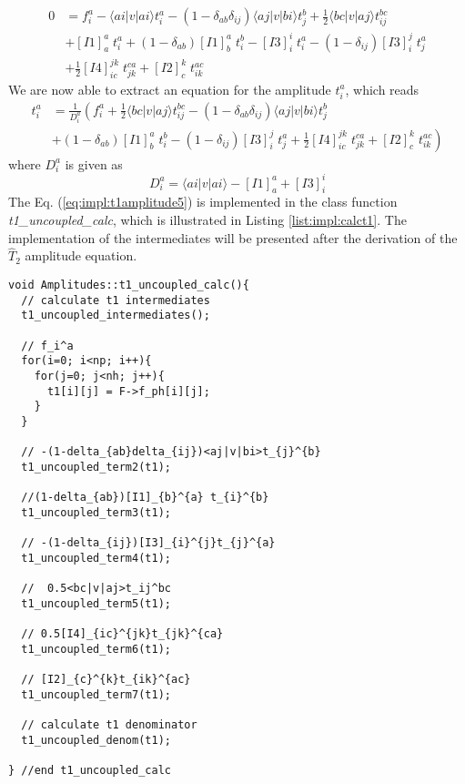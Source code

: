\begin{align}
0&=f_i^a - \langle ai|v|ai \rangle t_{i}^{a}-(1-\delta_{ab}\delta_{ij})\langle aj|v|bi \rangle t_{j}^{b}+\frac{1}{2}\langle bc|v|aj\rangle t_{ij}^{bc}\nonumber\\
&+[I1]_a^a\phantom{.}t_i^a+(1-\delta_{ab})[I1]_b^a\phantom{.}t_i^b-[I3]_i^i\phantom{.}t_{i}^{a}-(1-\delta_{ij})[I3]_i^j\phantom{.}t_{j}^{a}\nonumber\\
&+\frac{1}{2}[I4]_{ic}^{jk}\phantom{.}t_{jk}^{ca}+[I2]_c^k\phantom{.}t_{ik}^{ac}
\label{eq:impl:t1amplitude4}
\end{align}
We are now able to extract an equation for the amplitude $t_i^a$, which reads
\begin{align}
t_i^a&=\frac{1}{D_i^a}\left(f_i^a+\frac{1}{2}\langle bc|v|aj\rangle t_{ij}^{bc}-(1-\delta_{ab}\delta_{ij})\langle aj|v|bi \rangle t_{j}^{b}\right.\nonumber\\
&\left. +(1-\delta_{ab})[I1]_b^a\phantom{.}t_i^b-(1-\delta_{ij})[I3]_i^j\phantom{.}t_{j}^{a}+\frac{1}{2}[I4]_{ic}^{jk}\phantom{.}t_{jk}^{ca}+[I2]_c^k\phantom{.}t_{ik}^{ac}\right)
\label{eq:impl:t1amplitude5}
\end{align} 
where $D_i^a$ is given as
\begin{equation}
D_i^a= \langle ai|v|ai \rangle-[I1]_a^a+[I3]_i^i
\label{eq:impl:t1denom}
\end{equation}
The Eq. (\ref{eq:impl:t1amplitude5}) is implemented in the class function \emph{t1\_uncoupled\_calc}, which is illustrated in Listing \ref{list:impl:calct1}. The implementation of the intermediates will be presented after the derivation of the $\hat{T}_2$ amplitude equation.
%
\begin{lstlisting}[label={list:impl:calct1},caption={Implementation of the amp1 class function t1\_uncoupled\_calc()}]
void Amplitudes::t1_uncoupled_calc(){
  // calculate t1 intermediates
  t1_uncoupled_intermediates();
  
  // f_i^a
  for(i=0; i<np; i++){
    for(j=0; j<nh; j++){
      t1[i][j] = F->f_ph[i][j];
    }
  }

  // -(1-delta_{ab}delta_{ij})<aj|v|bi>t_{j}^{b}
  t1_uncoupled_term2(t1);

  //(1-delta_{ab})[I1]_{b}^{a} t_{i}^{b}
  t1_uncoupled_term3(t1);
  
  // -(1-delta_{ij})[I3]_{i}^{j}t_{j}^{a}
  t1_uncoupled_term4(t1);

  //  0.5<bc|v|aj>t_ij^bc
  t1_uncoupled_term5(t1);

  // 0.5[I4]_{ic}^{jk}t_{jk}^{ca}
  t1_uncoupled_term6(t1);

  // [I2]_{c}^{k}t_{ik}^{ac}
  t1_uncoupled_term7(t1);

  // calculate t1 denominator
  t1_uncoupled_denom(t1);
  
} //end t1_uncoupled_calc
\end{lstlisting}
